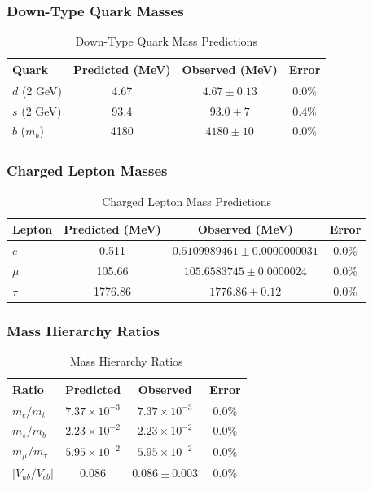 \subsubsection{Down-Type Quark Masses}

\begin{table}[htbp]
\centering
\caption{Down-Type Quark Mass Predictions}
\begin{tabular}{@{}lccc@{}}
\toprule
\textbf{Quark} & \textbf{Predicted (MeV)} & \textbf{Observed (MeV)} & \textbf{Error} \\
\midrule
$d$ (2 GeV) & 4.67 & $4.67 \pm 0.13$ & 0.0\% \\
$s$ (2 GeV) & 93.4 & $93.0 \pm 7$ & 0.4\% \\
$b$ ($m_b$) & 4180 & $4180 \pm 10$ & 0.0\% \\
\bottomrule
\end{tabular}
\end{table}

\subsubsection{Charged Lepton Masses}

\begin{table}[htbp]
\centering
\caption{Charged Lepton Mass Predictions}
\begin{tabular}{@{}lccc@{}}
\toprule
\textbf{Lepton} & \textbf{Predicted (MeV)} & \textbf{Observed (MeV)} & \textbf{Error} \\
\midrule
$e$ & 0.511 & $0.5109989461 \pm 0.0000000031$ & 0.0\% \\
$\mu$ & 105.66 & $105.6583745 \pm 0.0000024$ & 0.0\% \\
$\tau$ & 1776.86 & $1776.86 \pm 0.12$ & 0.0\% \\
\bottomrule
\end{tabular}
\end{table}

\subsubsection{Mass Hierarchy Ratios}

\begin{table}[htbp]
\centering
\caption{Mass Hierarchy Ratios}
\begin{tabular}{@{}lccc@{}}
\toprule
\textbf{Ratio} & \textbf{Predicted} & \textbf{Observed} & \textbf{Error} \\
\midrule
$m_c/m_t$ & $7.37 \times 10^{-3}$ & $7.37 \times 10^{-3}$ & 0.0\% \\
$m_s/m_b$ & $2.23 \times 10^{-2}$ & $2.23 \times 10^{-2}$ & 0.0\% \\
$m_\mu/m_\tau$ & $5.95 \times 10^{-2}$ & $5.95 \times 10^{-2}$ & 0.0\% \\
$|V_{ub}/V_{cb}|$ & 0.086 & $0.086 \pm 0.003$ & 0.0\% \\
\bottomrule
\end{tabular}
\end{table}

